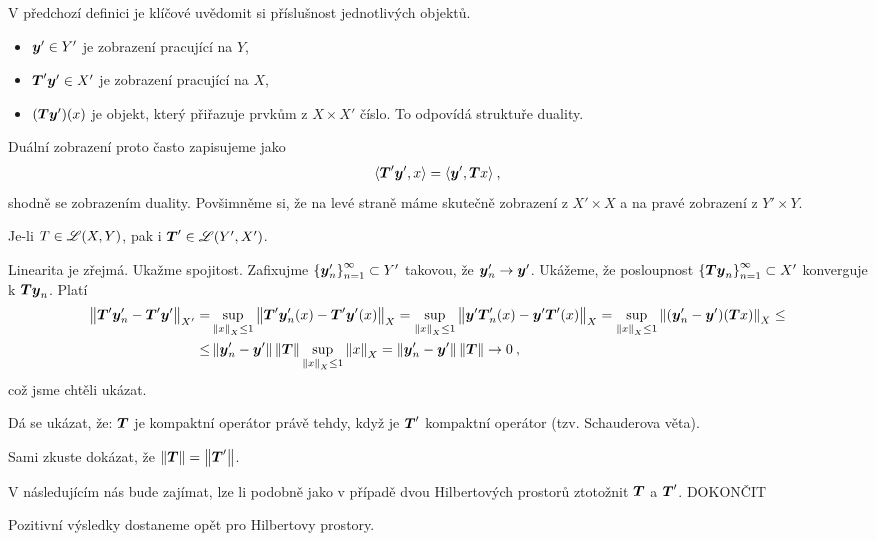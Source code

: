 V předchozí definici je klíčové uvědomit si příslušnost jednotlivých objektů. \begin{itemize}
    \item $\boldsymbol{y}' \in Y'$ je zobrazení pracující na $Y$,
    \item $\boldsymbol{T}' \boldsymbol{y}' \in X'$ je zobrazení pracující na $X$,
    \item $(\boldsymbol{T} \boldsymbol{y}')(x)$ je objekt, který přiřazuje prvkům z $X \times X'$ číslo. To odpovídá struktuře duality.
\end{itemize}
Duální zobrazení proto často zapisujeme jako \begin{align*}
    \langle \boldsymbol{T}' \boldsymbol{y}', x \rangle = \langle \boldsymbol{y}', \boldsymbol{T} x \rangle \:,
\end{align*}
shodně se zobrazením duality. Povšimněme si, že na levé straně máme skutečně zobrazení z $X' \times X$ a na pravé zobrazení z $Y' \times Y$.
\begin{remark}
Je-li $T \in \mathscr{L} (X,Y)$, pak i $\boldsymbol{T}' \in \mathscr{L}(Y', X')$. 

Linearita je zřejmá. Ukažme spojitost.  Zafixujme $\left \lbrace \boldsymbol{y}'_n \right \rbrace_{n=1}^\infty \subset Y'$ takovou, že $\boldsymbol{y}'_n \rightarrow \boldsymbol{y}'$. Ukážeme, že posloupnost $\left \lbrace \boldsymbol{T} \boldsymbol{y}_n \right \rbrace_{n=1}^\infty \subset X'$ konverguje k $\boldsymbol{T} \boldsymbol{y}_n$. Platí
\begin{align*}
    \left\lVert\boldsymbol{T}' \boldsymbol{y}'_n - \boldsymbol{T}' \boldsymbol{y}'\right\rVert_{X'} 
    =&
    \sup_{\left\lVert x\right\rVert_X \leq 1} \left\lVert\boldsymbol{T}' \boldsymbol{y}'_n (x)- \boldsymbol{T}' \boldsymbol{y}' (x)\right\rVert_X 
    =
    \sup_{\left\lVert x\right\rVert_X \leq 1} \left\lVert\boldsymbol{y}'  \boldsymbol{T}'_n (x)- \boldsymbol{y}' \boldsymbol{T}' (x)\right\rVert_X 
    =
    \sup_{\left\lVert x\right\rVert_X \leq 1} \left\lVert(\boldsymbol{y}'_n-\boldsymbol{y}') (\boldsymbol{T} x)\right\rVert_X 
    \leq \\
    \leq&
     \left\lVert\boldsymbol{y}'_n - \boldsymbol{y}'\right\rVert \left\lVert\boldsymbol{T}\right\rVert \sup_{\left\lVert x\right\rVert_X \leq 1} \left\lVert x\right\rVert_X 
    =
    \left\lVert\boldsymbol{y}'_n -\boldsymbol{y}'\right\rVert \left\lVert\boldsymbol{T}\right\rVert \rightarrow 0\:,
\end{align*}
což jsme chtěli ukázat.

Dá se ukázat, že: $\boldsymbol{T}$ je kompaktní operátor právě tehdy, když je $\boldsymbol{T}'$ kompaktní operátor (tzv. Schauderova věta).
\end{remark}

Sami zkuste dokázat, že $\left\lVert\boldsymbol{T}\right\rVert = \left\lVert\boldsymbol{T}'\right\rVert$.

V následujícím nás bude zajímat, lze li podobně jako v případě dvou Hilbertových prostorů ztotožnit $\boldsymbol{T}$ a $\boldsymbol{T}'$. DOKONČIT

Pozitivní výsledky dostaneme opět pro Hilbertovy prostory.

